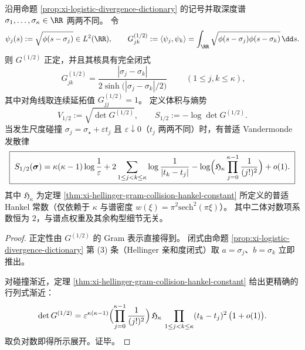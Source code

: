 \begin{proposition}\label{prop:xi-logistic-hellinger-gram-determinant}
沿用命题 \ref{prop:xi-logistic-divergence-dictionary} 的记号并取深度谱 \(\sigma_1,\dots,\sigma_\kappa\in\RR\) 两两不同。
令
\[
\psi_j(s):=\sqrt{\phi(s-\sigma_j)}\in L^2(\RR),
\qquad
G^{(1/2)}_{jk}:=\langle \psi_j,\psi_k\rangle=\int_{\RR}\sqrt{\phi(s-\sigma_j)\phi(s-\sigma_k)}\,\dd s.
\]
则 \(G^{(1/2)}\) 正定，并且其核具有完全闭式
\[
\boxed{\;
G^{(1/2)}_{jk}=\frac{|\sigma_j-\sigma_k|}{2\sinh\!\bigl(|\sigma_j-\sigma_k|/2\bigr)}\;}
\qquad(1\le j,k\le\kappa),
\]
其中对角线取连续延拓值 \(G^{(1/2)}_{jj}=1\)。
定义体积与熵势
\[
V_{1/2}:=\sqrt{\det G^{(1/2)}},
\qquad
S_{1/2}:=-\log\det G^{(1/2)}.
\]
当发生尺度碰撞 \(\sigma_j=\sigma_\star+\varepsilon t_j\) 且 \(\varepsilon\downarrow 0\)（\(t_j\) 两两不同）时，有普适 Vandermonde 发散律
\[
\boxed{\;
S_{1/2}(\boldsymbol{\sigma})
=\kappa(\kappa-1)\log\frac{1}{\varepsilon}
+2\sum_{1\le j<k\le \kappa}\log\frac{1}{|t_k-t_j|}
-\log\Bigl(\mathfrak H_\kappa\prod_{j=0}^{\kappa-1}\frac{1}{(j!)^{2}}\Bigr)
+o(1).\;}
\]
其中 \(\mathfrak H_\kappa\) 为定理 \ref{thm:xi-hellinger-gram-collision-hankel-constant} 所定义的普适 Hankel 常数（仅依赖于 \(\kappa\) 与谱密度 \(w(\xi)=\pi^2\mathrm{sech}^2(\pi\xi)\)）。
其中二体对数项系数恒为 \(2\)，与谱点权重及其余构型细节无关。
\end{proposition}
\begin{proof}
正定性由 \(G^{(1/2)}\) 的 Gram 表示直接得到。
闭式由命题 \ref{prop:xi-logistic-divergence-dictionary} 第 \textup{(3)} 条（Hellinger 亲和度闭式）取 \(a=\sigma_j\)、\(b=\sigma_k\) 立即推出。
\par
对碰撞渐近，定理 \ref{thm:xi-hellinger-gram-collision-hankel-constant} 给出更精确的行列式渐近：
\[
\det G^{(1/2)}
=\varepsilon^{\kappa(\kappa-1)}
\Bigl(\prod_{j=0}^{\kappa-1}\frac{1}{(j!)^{2}}\Bigr)\,
\mathfrak H_\kappa\,
\prod_{1\le j<k\le\kappa}(t_k-t_j)^{2}\,\bigl(1+o(1)\bigr).
\]
取负对数即得所示展开。证毕。
\end{proof}



